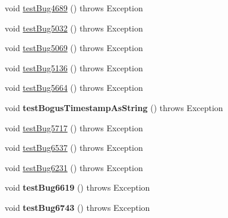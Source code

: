 \begin{DoxyCompactItemize}
\item 
void \mbox{\hyperlink{classtestsuite_1_1regression_1_1_result_set_regression_test_a57d92d98b7d1e7401db796d58e650a2b}{test\+Bug4689}} ()  throws Exception 
\item 
void \mbox{\hyperlink{classtestsuite_1_1regression_1_1_result_set_regression_test_a647daf219a6f3bba85706fa0aad0ca76}{test\+Bug5032}} ()  throws Exception 
\item 
void \mbox{\hyperlink{classtestsuite_1_1regression_1_1_result_set_regression_test_a3fc2285158514cb2ab7dcc1e3880113b}{test\+Bug5069}} ()  throws Exception 
\item 
void \mbox{\hyperlink{classtestsuite_1_1regression_1_1_result_set_regression_test_a9f4b082f0411dbf1f533998671d080cd}{test\+Bug5136}} ()  throws Exception 
\item 
void \mbox{\hyperlink{classtestsuite_1_1regression_1_1_result_set_regression_test_aaf08edff0fccda829794321f5eed7ca3}{test\+Bug5664}} ()  throws Exception 
\item 
\mbox{\label{classtestsuite_1_1regression_1_1_result_set_regression_test_ad40a060d01d13a1c3718497ece0ea53b}} 
void {\bfseries test\+Bogus\+Timestamp\+As\+String} ()  throws Exception 
\item 
void \mbox{\hyperlink{classtestsuite_1_1regression_1_1_result_set_regression_test_a08e8e83e8ac874e16cd5aa89e43f6862}{test\+Bug5717}} ()  throws Exception 
\item 
void \mbox{\hyperlink{classtestsuite_1_1regression_1_1_result_set_regression_test_abe87e577ef06bd6b70aa3f685177c272}{test\+Bug6537}} ()  throws Exception 
\item 
void \mbox{\hyperlink{classtestsuite_1_1regression_1_1_result_set_regression_test_aeb09775b50784baa772c121c33812f23}{test\+Bug6231}} ()  throws Exception 
\item 
\mbox{\label{classtestsuite_1_1regression_1_1_result_set_regression_test_a53c45e064577ff74f71310ab3a226198}} 
void {\bfseries test\+Bug6619} ()  throws Exception 
\item 
\mbox{\label{classtestsuite_1_1regression_1_1_result_set_regression_test_a7554fa92dd3ec004371bce0ace54f245}} 
void {\bfseries test\+Bug6743} ()  throws Exception 
\item 

\end{DoxyCompactItemize}
